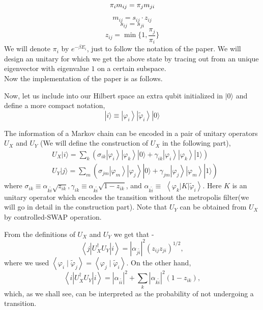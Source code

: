 $$	\pi_i m_{ij} = \pi_j m_{ji}\\$$
	
$$m_{ij}=s_{ij}\cdot z_{ij}$$
$$s_{ij}=s_{ji}$$
$$z_{ij}= \min \{1, \frac{\pi_j}{\pi_i}\}$$
We will denote $\pi_i$ by $e^{-\beta E_i}$, just to follow the notation of the paper. We will design an unitary for which we get the above state by tracing out from an unique eigenvector with eigenvalue $1$ on a certain subspace.\\
Now the implementation of the paper is as follows.

\begin{flushleft}
	Now, let us include into our Hilbert space an extra qubit initialized in $|0\rangle$ and define a more compact notation,
	$$
	|i\rangle \equiv\left|\varphi_i\right\rangle\left|\tilde{\varphi}_i\right\rangle|0\rangle
	$$
	
	The information of a Markov chain can be encoded in a pair of unitary operators $U_X$ and $U_Y$ (We will define the construction of $U_X$ in the following part),
	$$
	\begin{aligned}
		& U_X|i\rangle=\sum_k\left(\sigma_{i k}\left|\varphi_i\right\rangle\left|\varphi_k\right\rangle|0\rangle+\gamma_{i k}\left|\varphi_i\right\rangle\left|\varphi_k\right\rangle|1\rangle\right) \\
		& U_Y|j\rangle=\sum_m\left(\sigma_{j m}\left|\varphi_m\right\rangle\left|\varphi_j\right\rangle|0\rangle+\gamma_{j m}\left|\varphi_j\right\rangle\left|\varphi_m\right\rangle|1\rangle\right)
	\end{aligned}
	$$
	where $\sigma_{i k} \equiv \alpha_{k \tilde{i}} \sqrt{z_{i k}}, \gamma_{i k} \equiv \alpha_{k \tilde{i}} \sqrt{1-z_{i k}}$, and $\alpha_{k \tilde{i}} \equiv$ $\left\langle\varphi_k|K| \tilde{\varphi}_i\right\rangle$. Here $K$ is an unitary operator which encodes the transition without the metropolis filter(we will go in detail in the construction part). Note that $U_Y$ can be obtained from $U_X$ by controlled-SWAP operation.
	
	From the definitions of $U_X$ and $U_Y$ we get that -
	$$
	\left\langle j\left|U_X^{\dagger} U_Y\right| i\right\rangle=\left|\alpha_{j \tilde{i}}\right|^2\left(z_{i j} z_{j i}\right)^{1 / 2},
	$$
	where we used $\left\langle\varphi_i \mid \tilde{\varphi}_j\right\rangle=\left\langle\varphi_j \mid \tilde{\varphi}_i\right\rangle$. On the other hand,
	$$
	\left\langle i\left|U_X^{\dagger} U_Y\right| i\right\rangle=\left|\alpha_{i \tilde{i}}\right|^2+\sum_k\left|\alpha_{k \tilde{i}}\right|^2\left(1-z_{i k}\right),
	$$
	which, as we shall see, can be interpreted as the probability of not undergoing a transition.
	

\end{flushleft}
